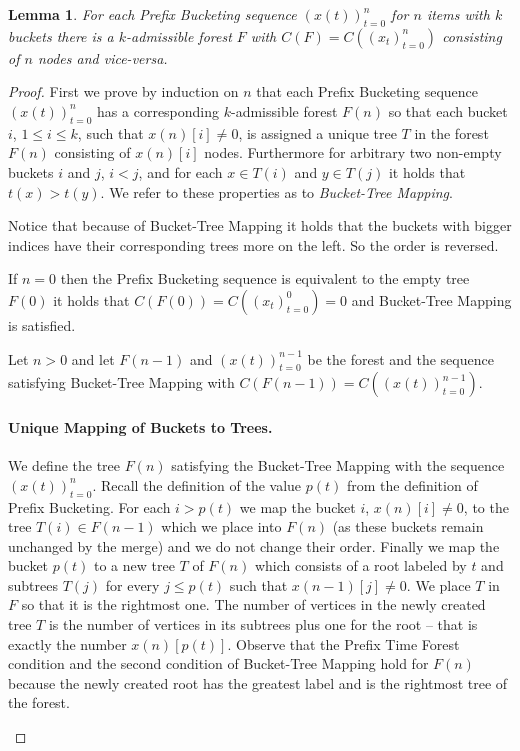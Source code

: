\documentclass{llncs}
\newtheorem{lemma}[definition]{Lemma}
\newcommand{\todo}[1]{\noindent{[{\bf ToDo:} #1]}}
\newcommand{\PB}{Prefix Bucketing}
\begin{document}
\begin{lemma}
\label{lm:1-1-pb-ptf}
For each \PB{} sequence $(x(t))_{t=0}^n$ for $n$ items with $k$ buckets there is a $k$-admissible forest $F$ with $C(F) = C((x_t)_{t = 0}^n)$ consisting of $n$ nodes and vice-versa.
\end{lemma}
\begin{proof}
First we prove by induction on $n$ that each \PB{} sequence $(x(t))_{t = 0}^n$ has a corresponding $k$-admissible forest $F(n)$ so that each bucket $i$, $1 \leq i \leq k$, such that $x(n)[i] \neq 0$, is assigned a unique tree $T$ in the forest $F(n)$ consisting of $x(n)[i]$ nodes. Furthermore for arbitrary two non-empty buckets $i$ and $j$, $i < j$, and for each $x \in T(i)$ and $y \in T(j)$ it holds that $t(x) > t(y)$.
We refer to these properties as to \emph{Bucket-Tree Mapping}.

Notice that because of Bucket-Tree Mapping it holds that the buckets with bigger indices have their corresponding trees more on the left. So the order is reversed. \todo{Oh poor english.}

\begin{case}
If $n = 0$ then the \PB{} sequence is equivalent to the empty tree $F(0)$ it holds that $C(F(0)) = C((x_t)_{t = 0}^0) = 0$ and Bucket-Tree Mapping is satisfied.
\end{case}

\begin{case}
Let $n > 0$ and let $F(n - 1)$ and $(x(t))_{t = 0}^{n - 1}$ be the forest and the sequence satisfying Bucket-Tree Mapping with $C(F(n - 1)) = C((x(t))_{t = 0}^{n - 1})$.
\paragraph{Unique Mapping of Buckets to Trees.}
We define the tree $F(n)$ satisfying the Bucket-Tree Mapping with the sequence $(x(t))_{t = 0}^n$.
Recall the definition of the value $p(t)$ from the definition of \PB{}. 
For each $i > p(t)$ we map the bucket $i$, $x(n)[i] \neq 0$, to the tree $T(i) \in F(n - 1)$ which we place into $F(n)$ (as these buckets remain unchanged by the merge) and we do not change their order.
Finally we map the bucket $p(t)$ to a new tree $T$ of $F(n)$ which consists of a root labeled by $t$ and subtrees $T(j)$ for every $j \leq p(t)$ such that $x(n - 1)[j] \neq 0$. We place $T$ in $F$ so that it is the rightmost one.
The number of vertices in the newly created tree $T$ is the number of vertices in its subtrees plus one for the root -- that is exactly the number $x(n)[p(t)]$.
Observe that the Prefix Time Forest condition and the second condition of Bucket-Tree Mapping hold for $F(n)$ because the newly created root has the greatest label and is the rightmost tree of the forest.


\end{case}
\end{proof}
\end{document}
